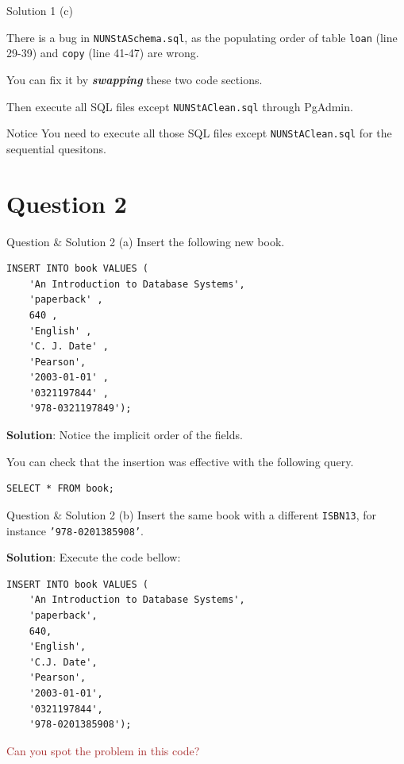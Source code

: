 \begin{frame}[fragile]{Solution 1 (c)}

There is a bug in \texttt{NUNStASchema.sql}, as the populating order of table \texttt{loan} (line 29-39) and \texttt{copy} (line 41-47) are wrong. \vspace{10pt}

You can fix it by \textbf{\textit{swapping}} these two code sections.\vspace{10pt}

Then execute all SQL files except \texttt{NUNStAClean.sql} through PgAdmin.

\begin{alertblock}{Notice}
You need to execute all those SQL files except \texttt{NUNStAClean.sql} for the sequential quesitons.
\end{alertblock}
\end{frame}

\section*{Question 2}

\begin{frame}[fragile]{Question \& Solution 2 (a)}
Insert the following new book.

\begin{lstlisting}
INSERT INTO book VALUES (
	'An Introduction to Database Systems',
	'paperback' , 
	640 , 
	'English' , 
	'C. J. Date' , 
	'Pearson',
	'2003-01-01' , 
	'0321197844' , 
	'978-0321197849');
\end{lstlisting} 


\textbf{Solution}: Notice the implicit order of the fields.

You can check that the insertion was effective with the following query.
\begin{lstlisting}
SELECT * FROM book;
\end{lstlisting}

\end{frame}

\begin{frame}[fragile]{Question \& Solution 2 (b)}
Insert the same book with a different \texttt{ISBN13}, for instance \texttt{'978-0201385908'}. \vspace{10pt}

\textbf{Solution}: Execute the code bellow:

\begin{lstlisting}
INSERT INTO book VALUES (
	'An Introduction to Database Systems', 
	'paperback', 
	640,
	'English',
	'C.J. Date', 
	'Pearson', 
	'2003-01-01', 
	'0321197844',  
	'978-0201385908');
\end{lstlisting}

\textcolor{brown}{Can you spot the problem in this code?}
\end{frame}

